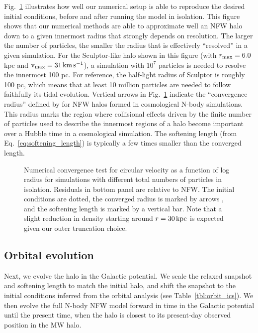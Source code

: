 Fig.~\ref{fig:numerical_convergence} illustrates how well our numerical
setup is able to reproduce the desired initial conditions, before and
after running the model in isolation. This figure shows that our
numerical methods are able to approximate well an NFW halo down to a
given innermost radius that strongly depends on resolution. The larger
the number of particles, the smaller the radius that is effectively
``resolved'' in a given simulation. For the Sculptor-like halo shown in
this figure (with \(r_{\rm max} = 6.0\,\)kpc and \({\rm v}_{\rm max} = 31\,{\rm km\,s^{-1}}\)), a
simulation with \(10^7\) particles is needed to resolve the innermost
100 pc. For reference, the half-light radius of Sculptor is roughly 100
pc, which means that at least 10 million particles are needed to follow
faithfully its tidal evolution. Vertical arrows in
Fig.~\ref{fig:numerical_convergence} indicate the ``convergence radius''
defined by \citet[eq.\textasciitilde13]{power+2003} for NFW halos formed
in cosmological N-body simulations. This radius marks the region where
collisional effects driven by the finite number of particles used to
describe the innermost regions of a halo become important over a Hubble
time in a cosmological simulation. The softening length (from
Eq.~\ref{eq:softening_length}) is typically a few times smaller than the
converged length.

\begin{figure}
\centering
{}
\caption[Numerical convergence of the N-body simulation]{Numerical
convergence test for circular velocity as a function of log radius for
simulations with different total numbers of particles in isolation.
Residuals in bottom panel are relative to NFW. The initial conditions
are dotted, the converged radius is marked by arrows \citep[eq.
13,][]{power+2003}, and the softening length is marked by a vertical
bar. Note that a slight reduction in density starting around
\(r = 30\,{\rm kpc}\) is expected given our outer truncation
choice.}\label{fig:numerical_convergence}
\end{figure}

\subsection{Orbital evolution}\label{orbital-evolution}

Next, we evolve the halo in the Galactic potential. We scale the relaxed
snapshot and softening length to match the initial halo, and shift the
snapshot to the initial conditions inferred from the orbital analysis
(see Table~\ref{tbl:orbit_ics}). We then evolve the full N-body NFW
model forward in time in the Galactic potential until the present time,
when the halo is closest to its present-day observed position in the MW
halo.


